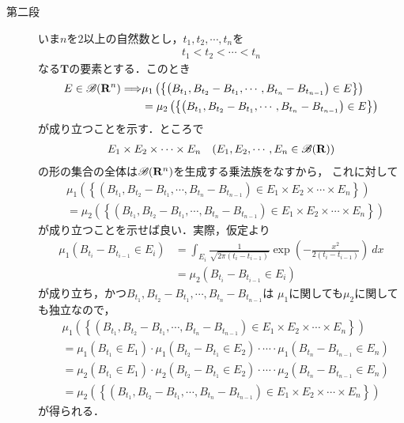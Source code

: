 \begin{prf}
\begin{description}
			\item[第二段]
				いま$n$を$2$以上の自然数とし，$t_1,t_2,\cdots,t_n$を
				\begin{align}
					t_1 < t_2 < \cdots < t_n
				\end{align}
				なる$\mathbf{T}$の要素とする．このとき
				\begin{align}
					E \in \mathscr{B}(\mathbf{R}^n) \Longrightarrow
					&\mu_1\left(\left\{\left(B_{t_1},B_{t_2}-B_{t_1},\cdots,B_{t_n}-B_{t_{n-1}}\right) \in E\right\}\right) \\
					&= \mu_2\left(\left\{\left(B_{t_1},B_{t_2}-B_{t_1},\cdots,B_{t_n}-B_{t_{n-1}}\right) \in E\right\}\right)
				\end{align}
				が成り立つことを示す．ところで
				\begin{align}
					E_1 \times E_2 \times \cdots \times E_n \quad (E_1, E_2,\cdots ,E_n \in \mathscr{B}(\mathbf{R}))
				\end{align}
				の形の集合の全体は$\mathscr{B}(\mathbf{R}^n)$を生成する乗法族をなすから，
				これに対して
				\begin{align}
					&\mu_1\left(\left\{\left(B_{t_1},B_{t_2}-B_{t_1},\cdots,B_{t_n}-B_{t_{n-1}}\right) \in E_1 \times E_2 \times \cdots \times E_n\right\}\right) \\
					&= \mu_2\left(\left\{\left(B_{t_1},B_{t_2}-B_{t_1},\cdots,B_{t_n}-B_{t_{n-1}}\right) \in E_1 \times E_2 \times \cdots \times E_n\right\}\right)
				\end{align}
				が成り立つことを示せば良い．実際，仮定より
				\begin{align}
					\mu_1\left(B_{t_i}-B_{t_{i-1}} \in E_i\right)
					&= \int_{E_i} \frac{1}{\sqrt{2\pi(t_i-t_{i-1})}} \exp\left(-\frac{x^2}{2(t_i-t_{i-1})}\right)\ dx \\
					&= \mu_2(B_{t_i}-B_{t_{i-1}} \in E_i)
				\end{align}
				が成り立ち，かつ$B_{t_1},B_{t_2}-B_{t_1},\cdots,B_{t_n} - B_{t_{n-1}}$は
				$\mu_1$に関しても$\mu_2$に関しても独立なので，
				\begin{align}
					&\mu_1\left(\left\{\left(B_{t_1},B_{t_2}-B_{t_1},\cdots,B_{t_n}-B_{t_{n-1}}\right) \in E_1 \times E_2 \times \cdots \times E_n\right\}\right) \\
					&= \mu_1\left(B_{t_1} \in E_1\right) \cdot \mu_1\left(B_{t_2}-B_{t_{1}} \in E_2\right) 
					\cdot \cdots \cdot \mu_1\left(B_{t_n}-B_{t_{n-1}} \in E_n\right) \\
					&= \mu_2\left(B_{t_1} \in E_1\right) \cdot \mu_2\left(B_{t_2}-B_{t_{1}} \in E_2\right) 
					\cdot \cdots \cdot \mu_2\left(B_{t_n}-B_{t_{n-1}} \in E_n\right) \\
					&= \mu_2\left(\left\{\left(B_{t_1},B_{t_2}-B_{t_1},\cdots,B_{t_n}-B_{t_{n-1}}\right) \in E_1 \times E_2 \times \cdots \times E_n\right\}\right)
				\end{align}
				が得られる．
				

\end{description}
\end{prf}
